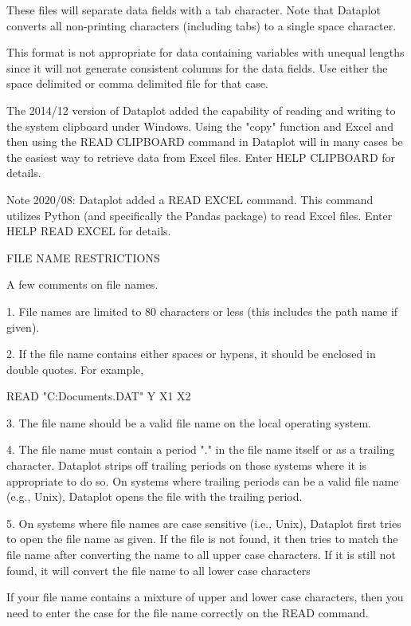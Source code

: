      These files will separate data fields with a tab character.
     Note that Dataplot converts all non-printing characters
     (including tabs) to a single space character.

     This format is not appropriate for data containing variables
     with unequal lengths since it will not generate consistent
     columns for the data fields.  Use either the space delimited
     or comma delimited file for that case.

The 2014/12 version of Dataplot added the capability of reading
and writing to the system clipboard under Windows.  Using the
"copy" function and Excel and then using the READ CLIPBOARD command
in Dataplot will in many cases be the easiest way to retrieve
data from Excel files.  Enter HELP CLIPBOARD for details.

Note 2020/08: Dataplot added a READ EXCEL command.  This command
utilizes Python (and specifically the Pandas package) to read Excel
files.  Enter HELP READ EXCEL for details.

FILE NAME RESTRICTIONS

A few comments on file names.

  1. File names are limited to 80 characters or less (this includes
     the path name if given).

  2. If the file name contains either spaces or hypens, it
     should be enclosed in double quotes.  For example,

       READ "C:\My Documents\SAMPLE.DAT"  Y X1 X2

  3. The file name should be a valid file name on the local
     operating system.

  4. The file name must contain a period "." in the file name itself
     or as a trailing character.  Dataplot strips off trailing periods
     on those systems where it is appropriate to do so.  On systems
     where trailing periods can be a valid file name (e.g., Unix),
     Dataplot opens the file with the trailing period.
 
  5. On systems where file names are case sensitive (i.e., Unix),
     Dataplot first tries to open the file name as given.  If the
     file is not found, it then tries to match the file name
     after converting the name to all upper case characters.  If
     it is still not found, it will convert the file name to all
     lower case characters

     If your file name contains a mixture of upper and lower case
     characters, then you need to enter the case for the file name
     correctly on the READ command.


